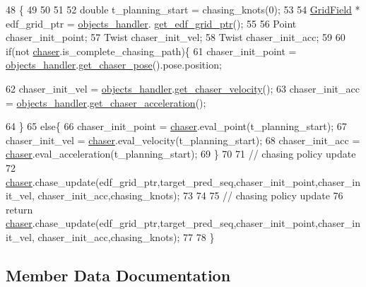 \begin{DoxyCode}
48                                                                                    \{
49   
50 
51 
52     \textcolor{keywordtype}{double} t\_planning\_start = chasing\_knots(0);
53 
54     \hyperlink{struct_grid_field}{GridField} * edf\_grid\_ptr = \hyperlink{class_wrapper_a8cddd5ffbaeb5ab0b5d8d8d0c74f810f}{objects\_handler}.
      \hyperlink{class_objects_handler_afe849882d1feeef8316a45632381da54}{get\_edf\_grid\_ptr}();
55 
56     Point chaser\_init\_point;
57     Twist chaser\_init\_vel; 
58     Twist chaser\_init\_acc;
59 
60     \textcolor{keywordflow}{if}(not \hyperlink{namespacechaser}{chaser}.is\_complete\_chasing\_path)\{    
61         chaser\_init\_point = \hyperlink{class_wrapper_a8cddd5ffbaeb5ab0b5d8d8d0c74f810f}{objects\_handler}.\hyperlink{class_objects_handler_a4ac7a7bb712575c2ff6ffbf37144cf56}{get\_chaser\_pose}().pose.position; 
         
62         chaser\_init\_vel = \hyperlink{class_wrapper_a8cddd5ffbaeb5ab0b5d8d8d0c74f810f}{objects\_handler}.\hyperlink{class_objects_handler_aa1af309b0e964ccb6df8dede045fa32b}{get\_chaser\_velocity}();
63         chaser\_init\_acc = \hyperlink{class_wrapper_a8cddd5ffbaeb5ab0b5d8d8d0c74f810f}{objects\_handler}.\hyperlink{class_objects_handler_a41d48832b07a4d4276147a99dd1d31bc}{get\_chaser\_acceleration}(); 
        
64     \}
65     \textcolor{keywordflow}{else}\{
66         chaser\_init\_point = \hyperlink{namespacechaser}{chaser}.eval\_point(t\_planning\_start);
67         chaser\_init\_vel = \hyperlink{namespacechaser}{chaser}.eval\_velocity(t\_planning\_start);
68         chaser\_init\_acc = \hyperlink{namespacechaser}{chaser}.eval\_acceleration(t\_planning\_start);
69     \}
70 
71     \textcolor{comment}{// chasing policy update }
72     \hyperlink{namespacechaser}{chaser}.chase\_update(edf\_grid\_ptr,target\_pred\_seq,chaser\_init\_point,chaser\_init\_vel,
      chaser\_init\_acc,chasing\_knots);   
73 
74 
75     \textcolor{comment}{// chasing policy update }
76     \textcolor{keywordflow}{return} \hyperlink{namespacechaser}{chaser}.chase\_update(edf\_grid\_ptr,target\_pred\_seq,chaser\_init\_point,chaser\_init\_vel,
      chaser\_init\_acc,chasing\_knots);   
77 
78 \}
\end{DoxyCode}


\subsection{Member Data Documentation}
